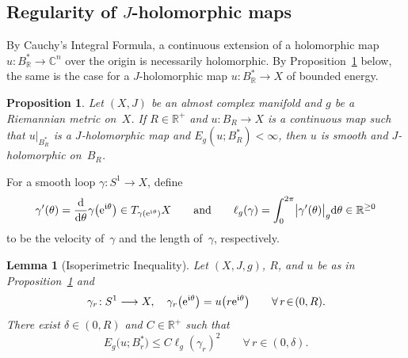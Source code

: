 \documentclass[11pt]{article}
\numberwithin{equation}{section}
\newtheorem{prp}[thm]{Proposition}
\newtheorem{lmm}[thm]{Lemma}
\theoremstyle{definition}
\def\BE#1{\begin{equation}\label{#1}}
\def\EE{\end{equation}}
\def\sf#1{\textsf{#1}}
\def\lra{\longrightarrow}
\def\C{\mathbb{C}}
\def\fI{\mathfrak i}
\def\R{\mathbb R}
\def\ga{\gamma}
\def\de{\delta}
\def\th{\theta}
\def\i{\infty}
\def\nd{\textnormal{d}}
\def\ne{\textnormal{e}}
\begin{document}
\subsection{Regularity of $J$-holomorphic maps}
\label{Regul_subs}

\noindent
By Cauchy's Integral Formula, a continuous extension of
a holomorphic map \hbox{$u\!:B_{\R}^*\!\lra\!\C^n$} over the origin
is necessarily holomorphic.
By Proposition~\ref{JHolomreg_prp} below, the same is the case
for a \hbox{$J$-holomorphic} map $u\!:B_{\R}^*\!\lra\!X$
of bounded energy.


\begin{prp}\label{JHolomreg_prp}
Let $(X,J)$ be an almost complex manifold and $g$ be a Riemannian metric on~$X$.
If $R\!\in\!\R^+$ and $u\!:B_R\!\lra\!X$ is a continuous map such that 
$u|_{B_R^*}$ is a $J$-holomorphic map and $E_g(u;B_R^*)\!<\!\i$, 
then $u$ is smooth and $J$-holomorphic on~$B_R$.
\end{prp}

\noindent
For a smooth loop $\ga\!:S^1\!\lra\!X$, define
$$\ga'(\th)=\frac{\nd}{\nd\th}\ga\big(\ne^{\fI\th}\big)\in T_{\ga(\ne^{\fI\th})}X
\qquad\hbox{and}\qquad
\ell_g(\ga)=\int_0^{2\pi}\!\big|\ga'(\th)\big|_g \nd\th\in\R^{\ge0}$$
to be the \sf{velocity} of~$\ga$ and the \sf{length} of~$\ga$, respectively.

\begin{lmm}[Isoperimetric Inequality]\label{JHolomreg_lmm}
Let $(X,J,g)$, $R$, and $u$ be as in Proposition~\ref{JHolomreg_prp} and 
$$\ga_r\!:S^1\lra X,\quad \ga_r\big(\ne^{\fI\th}\big)=u\big(r\ne^{\fI\th}\big)
\qquad\forall\,r\!\in\!(0,R).$$
There exist $\de\!\in\!(0,R)$ and $C\!\in\!\R^+$ such that 
\BE{JHolomreg1_e}E_g\big(u;B_r^*\big)\le C\ell_g(\ga_r)^2 \qquad\forall\,r\!\in\!(0,\de).\EE
\end{lmm}
\end{document}
